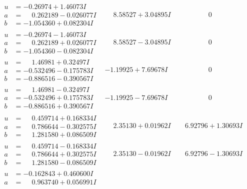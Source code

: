 \documentclass[1p]{elsarticle_modified}
\theoremstyle{definition}
\begin{document}
$$\begin{array}{c|c|c}
 \hline 
\begin{aligned}
u &= -0.26974 + 1.46073 I \\
a &= \phantom{-}0.262189 - 0.026077 I \\
b &= -1.054360 + 0.082304 I\end{aligned}
 & \phantom{-}8.58527 + 3.04895 I & \phantom{-0.000000 } 0 \\ \hline\begin{aligned}
u &= -0.26974 - 1.46073 I \\
a &= \phantom{-}0.262189 + 0.026077 I \\
b &= -1.054360 - 0.082304 I\end{aligned}
 & \phantom{-}8.58527 - 3.04895 I & \phantom{-0.000000 } 0 \\ \hline\begin{aligned}
u &= \phantom{-}1.46981 + 0.32497 I \\
a &= -0.532496 - 0.175783 I \\
b &= -0.886516 - 0.390567 I\end{aligned}
 & -1.19925 + 7.69678 I & \phantom{-0.000000 } 0 \\ \hline\begin{aligned}
u &= \phantom{-}1.46981 - 0.32497 I \\
a &= -0.532496 + 0.175783 I \\
b &= -0.886516 + 0.390567 I\end{aligned}
 & -1.19925 - 7.69678 I & \phantom{-0.000000 } 0 \\ \hline\begin{aligned}
u &= \phantom{-}0.459714 + 0.168334 I \\
a &= \phantom{-}0.786644 - 0.302575 I \\
b &= \phantom{-}1.281580 + 0.086509 I\end{aligned}
 & \phantom{-}2.35130 + 0.01962 I & \phantom{-}6.92796 + 1.30693 I \\ \hline\begin{aligned}
u &= \phantom{-}0.459714 - 0.168334 I \\
a &= \phantom{-}0.786644 + 0.302575 I \\
b &= \phantom{-}1.281580 - 0.086509 I\end{aligned}
 & \phantom{-}2.35130 - 0.01962 I & \phantom{-}6.92796 - 1.30693 I \\ \hline\begin{aligned}
u &= -0.162843 + 0.460600 I \\
a &= \phantom{-}0.963740 + 0.056991 I \\

\end{aligned}
\end{array}$$
\end{document}
